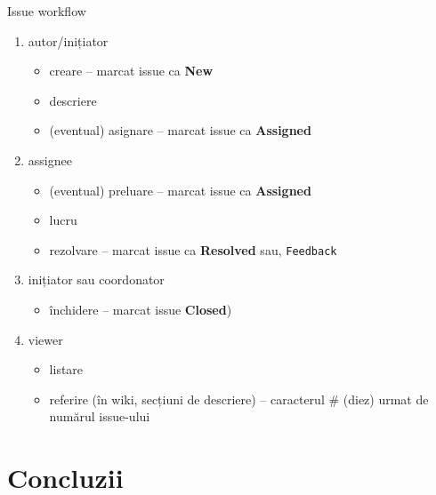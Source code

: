 \documentclass{beamer}
\begin{document}
\begin{frame}{Issue workflow}
  \begin{enumerate}
    \item autor/inițiator
      \begin{itemize}
        \item creare -- marcat issue ca \textbf{New}
        \item descriere
        \item (eventual) asignare -- marcat issue ca \textbf{Assigned}
      \end{itemize}
    \item assignee
      \begin{itemize}
        \item (eventual) preluare -- marcat issue ca \textbf{Assigned}
        \item lucru
        \item rezolvare -- marcat issue ca \textbf{Resolved} sau,
        \texttt{Feedback}
      \end{itemize}
    \item inițiator sau coordonator
      \begin{itemize}
        \item închidere -- marcat issue \textbf{Closed})
      \end{itemize}
    \item viewer
      \begin{itemize}
        \item listare
        \item referire (în wiki, secțiuni de descriere) -- caracterul \# (diez) urmat de numărul issue-ului
      \end{itemize}
  \end{enumerate}
\end{frame}

\section{Concluzii}
\end{document}
